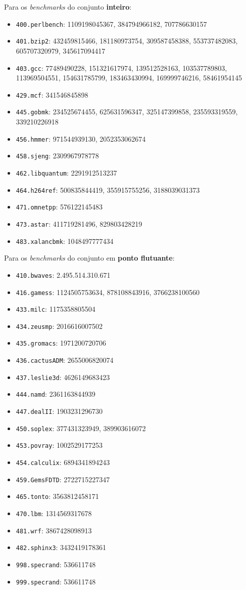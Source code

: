 \documentclass[12pt]{article}
\begin{document}
Para os \textit{benchmarks} do conjunto \textbf{inteiro}:
\begin {itemize}
\item \texttt{400.perlbench}: 1109198045367, 384794966182, 707786630157
\item \texttt{401.bzip2}: 432459815466, 181180973754, 309587458388,
553737482083, 605707320979, 345617094417
\item \texttt{403.gcc}: 77489490228, 151321617974, 139512528163, 103537789803,
113969504551, 154631785799, 183463430994, 169999746216, 58461954145
\item \texttt{429.mcf}: 341546845898
\item \texttt{445.gobmk}: 234525674455, 625631596347, 325147399858, 235593319559, 339210226918
\item \texttt{456.hmmer}: 971544939130, 2052353062674
\item \texttt{458.sjeng}: 2309967978778
\item \texttt{462.libquantum}: 2291912513237
\item \texttt{464.h264ref}: 500835844419, 355915755256, 3188039031373
\item \texttt{471.omnetpp}: 576122145483
\item \texttt{473.astar}: 411719281496, 829803428219
\item \texttt{483.xalancbmk}: 1048497777434
\end {itemize}

Para os \textit{benchmarks} do conjunto em \textbf{ponto flutuante}:

\begin {itemize}
\item \texttt{410.bwaves}: 2.495.514.310.671
\item \texttt{416.gamess}: 1124505753634, 878108843916, 3766238100560
\item \texttt{433.milc}: 1175358805504
\item \texttt{434.zeusmp}: 2016616007502
\item \texttt{435.gromacs}: 1971200720706
\item \texttt{436.cactusADM}: 2655006820074
\item \texttt{437.leslie3d}: 4626149683423
\item \texttt{444.namd}: 2361163844939
\item \texttt{447.dealII}: 1903231296730
\item \texttt{450.soplex}: 377431323949, 389903616072
\item \texttt{453.povray}: 1002529177253
\item \texttt{454.calculix}: 6894341894243
\item \texttt{459.GemsFDTD}: 2722715227347
\item \texttt{465.tonto}: 3563812458171
\item \texttt{470.lbm}: 1314569317678
\item \texttt{481.wrf}: 3867428098913
\item \texttt{482.sphinx3}: 3432419178361
\item \texttt{998.specrand}: 536611748
\item \texttt{999.specrand}: 536611748
\end{itemize}
\end{document}
